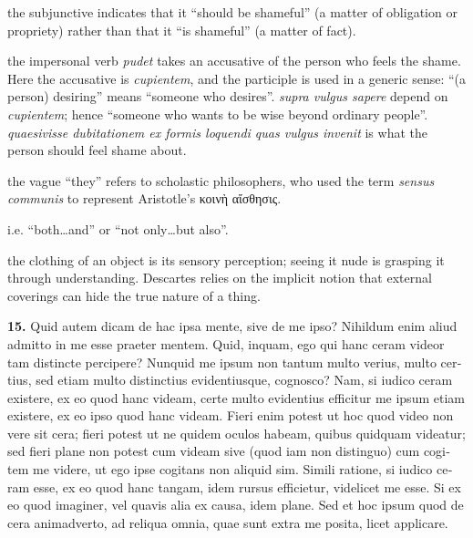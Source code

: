  the subjunctive indicates that it ``should be shameful'' (a matter of obligation or propriety) rather than that it ``is shameful'' (a matter of fact).

 the impersonal verb \textit{pudet} takes an accusative of the person who feels the shame. Here the accusative is \textit{cupientem}, and the participle is used in a generic sense: ``(a person) desiring'' means ``someone who desires''. \textit{supra vulgus sapere} depend on \textit{cupientem}; hence ``someone who wants to be wise beyond ordinary people''. \textit{quaesivisse dubitationem ex formis loquendi quas vulgus invenit} is what the person should feel shame about.

 the vague ``they'' refers to scholastic philosophers, who used the term \textit{sensus communis} to represent Aristotle's κοινὴ αἴσθησις.

 i.e. ``both\dots and'' or ``not only\dots but also''.

 the clothing of an object is its sensory perception; seeing it nude is grasping it through understanding. Descartes relies on the implicit notion that external coverings can hide the true nature of a thing.

\clearpage

\beginnumbering
\pstart
\begin{latin}
    \textenglish{\textbf{15.}} Quid autem dicam de hac ipsa mente, sive de me ipso? Nihildum enim aliud admitto in me esse praeter mentem. Quid, inquam, ego qui hanc ceram videor tam distincte percipere? Nunquid me ipsum non tantum multo verius, multo certius, sed etiam multo distinctius evidentiusque, cognosco? Nam, si iudico ceram existere, ex eo quod hanc videam, certe multo evidentius efficitur me ipsum etiam existere, ex eo ipso quod hanc videam. Fieri enim potest ut hoc quod video non vere sit cera; fieri potest ut ne quidem oculos habeam, quibus quidquam videatur; sed fieri plane non potest cum videam sive (quod iam non distinguo) cum cogitem me videre, ut ego ipse cogitans non aliquid sim. Simili ratione, si iudico ceram esse, ex eo quod hanc tangam, idem rursus efficietur, videlicet me esse. Si ex eo quod imaginer, vel quavis alia ex causa, idem plane. Sed et hoc ipsum quod de cera animadverto, ad reliqua omnia, quae sunt extra me posita, licet applicare.
\end{latin}
\pend
\endnumbering

